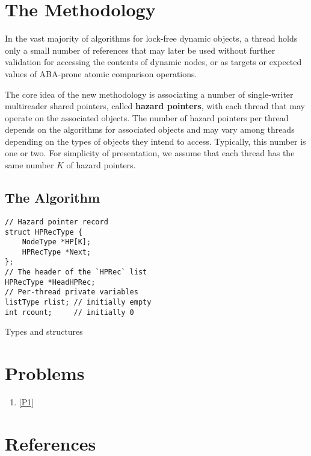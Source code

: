 \documentclass[11pt]{article}
\begin{document}
\section{The Methodology}
\label{sec:org499800b}
\begin{observation}
In the vast majority of algorithms for lock-free dynamic objects, a thread holds only a small number
of references that may later be used without further validation for accessing the contents of dynamic
nodes, or as targets or expected values of ABA-prone atomic comparison operations.
\end{observation}

The core idea of the new methodology is associating a number of single-writer multireader shared
pointers, called \textbf{hazard pointers}, with each thread that may operate on the associated objects. The
number of hazard pointers per thread depends on the algorithms for associated objects and may vary
among threads depending on the types of objects they intend to access. Typically, this number is one
or two. For simplicity of presentation, we assume that each thread has the same number \(K\) of hazard
pointers.
\subsection{The Algorithm}
\label{sec:org0c5000d}
\begin{listing}[htbp]
\begin{verbatim}
// Hazard pointer record
struct HPRecType {
    NodeType *HP[K];
    HPRecType *Next;
};
// The header of the `HPRec` list
HPRecType *HeadHPRec;
// Per-thread private variables
listType rlist; // initially empty
int rcount;     // initially 0
\end{verbatim}
\caption{Types and structures}
\end{listing}
\section{Problems}
\label{sec:orgd5478d6}
\begin{enumerate}
\item \ref{P1}
\end{enumerate}
\section{References}
\label{sec:orgadb3b11}
\label{bibliographystyle link}


\label{bibliography link}

\end{document}

